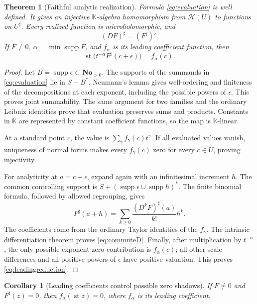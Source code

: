 \documentclass[11pt,letterpaper]{article}
\numberwithin{equation}{section}
\newtheorem{theorem}{Theorem}[section]
\newtheorem{corollary}[corollary]{Corollary}
\theoremstyle{definition}
\theoremstyle{remark}
\newcommand{\No}{\mathbf{No}}
\newcommand{\K}{\mathbb K}
\newcommand{\HH}{\mathscr H}
\DeclareMathOperator{\supp}{supp}
\DeclareMathOperator{\st}{st}
\begin{document}
\begin{theorem}[Faithful analytic realization]\label{thm:Hahneval}
Formula \eqref{eq:evaluation} is well defined. It gives an injective
$\K$-algebra homomorphism from $\HH(U)$ to functions on $U^\sharp$.
Every realized function is microholomorphic, and
\begin{equation}\label{eq:commuteD}
 (D F)^\sharp=(F^\sharp)'.
\end{equation}
If $F\ne0$, $\alpha=\min\supp F$, and $f_\alpha$ is its leading
coefficient function, then
\begin{equation}\label{eq:leadingreduction}
 \st\bigl(t^{-\alpha}F^\sharp(c+\epsilon)\bigr)=f_\alpha(c).
\end{equation}
\end{theorem}
\begin{proof}
Let $B=\supp\epsilon\subset\No_{>0}$. The supports of the summands in
\eqref{eq:evaluation} lie in $S+B^*$. Neumann's lemma gives well-ordering
and finiteness of the decompositions at each exponent, including the
possible powers of $\epsilon$. This proves joint summability. The same
argument for two families and the ordinary Leibniz identities prove that
evaluation preserves sums and products. Constants in $\K$ are represented
by constant coefficient functions, so the map is $\K$-linear.

At a standard point $c$, the value is $\sum_\gamma f_\gamma(c)t^\gamma$.
If all evaluated values vanish, uniqueness of normal forms makes every
$f_\gamma(c)$ zero for every $c\in U$, proving injectivity.

For analyticity at $a=c+\epsilon$, expand again with an infinitesimal
increment $h$. The common controlling support is
$S+(\supp\epsilon\cup\supp h)^*$. The finite binomial formula, followed
by allowed regrouping, gives
\[
 F^\sharp(a+h)=\sum_{k\ge0}\frac{(D^kF)^\sharp(a)}{k!}h^k.
\]
The coefficients come from the ordinary Taylor identities of the
$f_\gamma$. The intrinsic differentiation theorem proves
\eqref{eq:commuteD}. Finally, after multiplication by $t^{-\alpha}$,
the only possible exponent-zero contribution is $f_\alpha(c)$;
all other scale differences and all positive powers of $\epsilon$ have
positive valuation. This proves \eqref{eq:leadingreduction}.
\end{proof}

\begin{corollary}[Leading coefficients control possible zero shadows]
If $F\ne0$ and $F^\sharp(z)=0$, then
$f_\alpha(\st z)=0$, where $f_\alpha$ is its leading coefficient.
\end{corollary}
\end{document}
